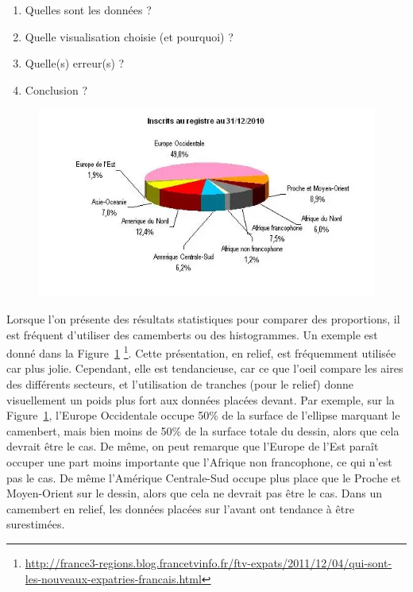 \documentclass[10pt, a4paper]{article}
\begin{document}
\begin{tcolorbox}[lefttitle=2cm,colback=white, colframe=gray!75!black, title=\textbf{Analyse d'une datavisualisation issue d'un reportage de France3}]
\begin{enumerate}
    \item Quelles sont les données ?
    \item Quelle visualisation choisie (et pourquoi) ?
    \item Quelle(s) erreur(s) ?
    \item Conclusion ?
\end{enumerate}

\begin{figure}[H]
    \includegraphics[scale = 0.5]{chapitre1/figures/Camembert-expat.png}
    \label{fig:France3}
\end{figure}
\vspace{3.5cm}


\end{tcolorbox}








Lorsque l’on présente des résultats statistiques pour comparer des proportions, il est fréquent d’utiliser des camemberts ou des histogrammes. Un exemple est donné dans la Figure~\ref{fig:France3} \footnote{\url{http://france3-regions.blog.francetvinfo.fr/ftv-expats/2011/12/04/qui-sont-les-nouveaux-expatries-francais.html}}. Cette présentation, en relief, est fréquemment
utilisée car plus jolie. Cependant, elle est tendancieuse, car ce que l’oeil compare les aires des différents secteurs, et l’utilisation de tranches (pour le relief) donne visuellement un poids plus fort aux données placées devant. 
Par exemple,
sur la Figure~\ref{fig:France3}, l’Europe Occidentale occupe 50\% de la surface de l’ellipse marquant le camenbert, mais bien moins
de 50\% de la surface totale du dessin, alors que cela devrait être le cas. De même, on peut remarque que l’Europe
de l’Est paraît occuper une part moins importante que l’Afrique non francophone, ce qui n’est pas le cas. De même
l’Amérique Centrale-Sud occupe plus place que le Proche et Moyen-Orient sur le dessin, alors que cela ne devrait pas
être le cas. Dans un camembert en relief, les données placées sur l’avant ont tendance à être surestimées. 
\end{document}
